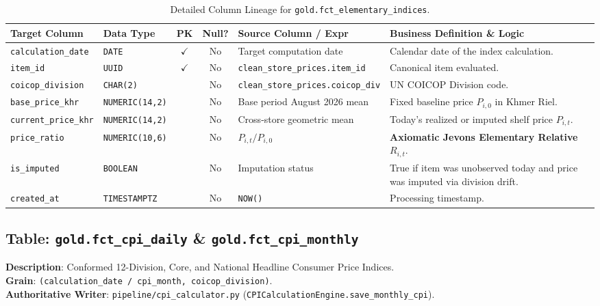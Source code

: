 \documentclass[a4paper, 11pt]{article}
\begin{document}
\begin{table}[H]
\centering
\small
\begin{tabularx}{\textwidth}{l p{2.5cm} c c p{4.2cm} X}
\toprule
\textbf{Target Column} & \textbf{Data Type} & \textbf{PK} & \textbf{Null?} & \textbf{Source Column / Expr} & \textbf{Business Definition \& Logic} \\
\midrule
\texttt{calculation\_date} & \texttt{DATE} & $\checkmark$ & No & Target computation date & Calendar date of the index calculation. \\
\texttt{item\_id} & \texttt{UUID} & $\checkmark$ & No & \texttt{clean\_store\_prices.item\_id} & Canonical item evaluated. \\
\texttt{coicop\_division} & \texttt{CHAR(2)} & & No & \texttt{clean\_store\_prices.coicop\_div} & UN COICOP Division code. \\
\texttt{base\_price\_khr} & \texttt{NUMERIC(14,2)} & & No & Base period August 2026 mean & Fixed baseline price $P_{i, 0}$ in Khmer Riel. \\
\texttt{current\_price\_khr} & \texttt{NUMERIC(14,2)} & & No & Cross-store geometric mean & Today's realized or imputed shelf price $P_{i, t}$. \\
\texttt{price\_ratio} & \texttt{NUMERIC(10,6)} & & No & $P_{i, t} / P_{i, 0}$ & \textbf{Axiomatic Jevons Elementary Relative} $R_{i, t}$. \\
\texttt{is\_imputed} & \texttt{BOOLEAN} & & No & Imputation status & True if item was unobserved today and price was imputed via division drift. \\
\texttt{created\_at} & \texttt{TIMESTAMPTZ} & & No & \texttt{NOW()} & Processing timestamp. \\
\bottomrule
\end{tabularx}
\caption{Detailed Column Lineage for \texttt{gold.fct\_elementary\_indices}.}
\end{table}

\subsection{Table: \texttt{gold.fct\_cpi\_daily} \& \texttt{gold.fct\_cpi\_monthly}}
\textbf{Description}: Conformed 12-Division, Core, and National Headline Consumer Price Indices. \\
\textbf{Grain}: \texttt{(calculation\_date / cpi\_month, coicop\_division)}. \\
\textbf{Authoritative Writer}: \texttt{pipeline/cpi\_calculator.py} (\texttt{CPICalculationEngine.save\_monthly\_cpi}).
\end{document}
